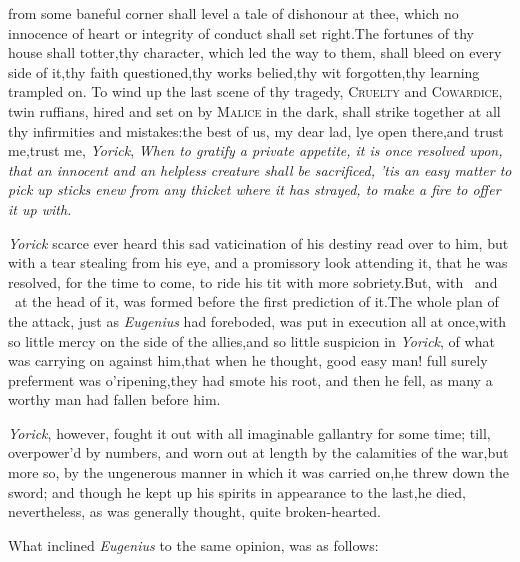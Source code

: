 \documentclass{article}
\begin{document}
 from some baneful corner shall level a tale of dishonour at
thee,
which no innocence of heart or integrity of conduct shall set right.\tsh  The
fortunes of thy house shall totter,\tsk  thy character, which led the way to them,
shall bleed on every side of it,\tsk  thy faith questioned,\tsk  thy works
belied,\tsk  thy wit forgotten,\tsk  thy learning trampled on. To wind up the last
scene of thy tragedy, \textsc{Cruelty} and \textsc{Cowardice}, twin ruffians, hired
and set on by \textsc{Malice} in the dark, shall strike together at all thy
infirmities and mistakes:\tsh  the best of us, my dear lad, lye open there,\tsk  and
trust me,\tsk\break  trust me, \textit{Yorick}, \textit{When to gratify a private appetite, it is
once resolved upon, that an innocent and an helpless creature shall be sacrificed,
’tis an easy matter to pick up sticks enew from any thicket where it has strayed,
to make a fire to offer it up with.}\\

\textit{Yorick} scarce ever heard this sad vaticination of his
destiny read over to him, but with a tear stealing from his eye,
and a promissory look attending it, that he was resolved, for the
time to come, to ride his tit with more sobriety.\tsh  But,
with \astv\ and \astv\ at the 
head of it, was formed before the first prediction of it.\tsk  The
whole plan of the attack, just as \textit{Eugenius} had foreboded,
was put in execution all at once,\tsk  with so little mercy on the side of the allies,\tsk  and so little
suspicion in \textit{Yorick}, of what was carrying on against
him,\tsk  that when he thought, good easy man! full surely
preferment was o’ripening,\tsk  they had smote his root, and
then he fell, as many a worthy man had fallen before him.\\

\textit{Yorick}, however, fought it out with all imaginable
gallantry for some time; till, overpower’d by numbers, and worn out
at length by the calamities of the war,\tsk  but more so, by the
ungenerous manner in which it was carried on,\tsk  he threw down
the sword; and though he kept up his spirits in appearance to the
last,\tsk he died, nevertheless, as was generally thought, quite
broken-hearted.

What inclined \textit{Eugenius} to the same opinion, was as
follows:
\end{document}
